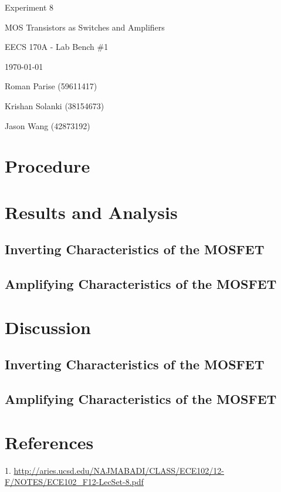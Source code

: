 \documentclass{article}
\begin{document}
\begin{titlepage}
	\centering
	\vspace{2.5cm}
	\vspace{1cm}
	{\huge Experiment 8 \par}
	{\LARGE MOS Transistors as Switches and Amplifiers \par}
	{\Large EECS 170A - Lab Bench \#1 \par}
	{\Large \today \par}
	\vspace{1cm}
	{\large Roman Parise (59611417) \par}
	{\large Krishan Solanki (38154673) \par}
	{\large Jason Wang (42873192) \par}
	\vspace{1cm}
\end{titlepage}
\section{Procedure}

\section{Results and Analysis}
\subsection{Inverting Characteristics of the MOSFET}

\subsection{Amplifying Characteristics of the MOSFET}

\section{Discussion}
\subsection{Inverting Characteristics of the MOSFET}

\subsection{Amplifying Characteristics of the MOSFET}

\section{References}
1. \url{http://aries.ucsd.edu/NAJMABADI/CLASS/ECE102/12-F/NOTES/ECE102_F12-LecSet-8.pdf} \\
\end{document}
